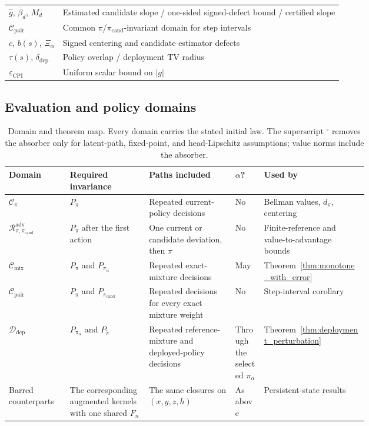 \documentclass{article}
\theoremstyle{plain}
\theoremstyle{definition}
\theoremstyle{remark}
\begin{document}
\begin{table}[t]
\begin{center}
\begin{tabularx}{\linewidth}{@{}lX@{}}
$\widehat g$, $\overline{\beta}_d$, $M_d$ & Estimated candidate slope / one-sided signed-defect bound / certified slope \\
$\mathcal C_{\mathrm{pair}}$ & Common $\pi$/$\pi_{\mathrm{cand}}$-invariant domain for step intervals \\
$c$, $b(s)$, $\Xi_\alpha$ & Signed centering and candidate estimator defects \\
$\tau(s)$, $\delta_{\mathrm{dep}}$ & Policy overlap / deployment TV radius \\
$\varepsilon_{\mathrm{CPI}}$ & Uniform scalar bound on $|g|$ \\
\bottomrule
\end{tabularx}
\end{center}
\end{table}

\subsection{Evaluation and policy domains}
\label{app:adv_closure_full}

\begin{table}[t]
\caption{Domain and theorem map. Every domain carries the stated initial law.
The superscript ${}^\circ$ removes the absorber only for latent-path,
fixed-point, and head-Lipschitz assumptions; value norms include the absorber.}
\label{tab:domain_map}
\centering
\scriptsize
\setlength{\tabcolsep}{3pt}
\renewcommand{\arraystretch}{1.12}
\begin{tabularx}{\linewidth}{@{}p{0.17\linewidth}p{0.22\linewidth}p{0.24\linewidth}p{0.08\linewidth}X@{}}
\toprule
Domain & Required invariance & Paths included & $\alpha$? & Used by \\
\midrule
$\mathcal C_\pi$
& $P_\pi$
& Repeated current-policy decisions
& No
& Bellman values, $d_\pi$, centering \\
$\mathcal R_{\pi,\pi_{\mathrm{cand}}}^{\mathrm{adv}}$
& $P_\pi$ after the first action
& One current or candidate deviation, then $\pi$
& No
& Finite-reference and value-to-advantage bounds \\
$\mathcal C_{\mathrm{mix}}$
& $P_\pi$ and $P_{\pi_\alpha}$
& Repeated exact-mixture decisions
& May
& Theorem~\ref{thm:monotone_with_error} \\
$\mathcal C_{\mathrm{pair}}$
& $P_\pi$ and $P_{\pi_{\mathrm{cand}}}$
& Repeated decisions for every exact mixture weight
& No
& Step-interval corollary \\
$\mathcal D_{\mathrm{dep}}$
& $P_{\pi_\alpha}$ and $P_{\widetilde\pi}$
& Repeated reference-mixture and deployed-policy decisions
& Through the selected $\pi_\alpha$
& Theorem~\ref{thm:deployment_perturbation} \\
Barred counterparts
& The corresponding augmented kernels with one shared $F_n$
& The same closures on $(x,y,z,h)$
& As above
& Persistent-state results \\
\bottomrule
\end{tabularx}
\end{table}
\end{document}
